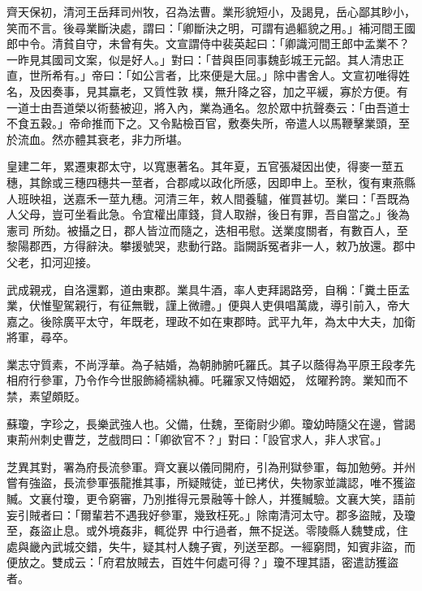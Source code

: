 \begin{pinyinscope}
 齊天保初，清河王岳拜司州牧，召為法曹。業形貌短小，及謁見，岳心鄙其眇小，笑而不言。後尋業斷決處，謂曰：「卿斷決之明，可謂有過軀貌之用。」補河間王國郎中令。清貧自守，未曾有失。文宣謂侍中裴英起曰：「卿識河間王郎中孟業不？一昨見其國司文案，似是好人。」對曰：「昔與臣同事魏彭城王元韶。其人清忠正直，世所希有。」帝曰：「如公言者，比來便是大屈。」除中書舍人。文宣初唯得姓名，及因奏事，見其羸老，又質性敦
 樸，無升降之容，加之平緩，寡於方便。有一道士由吾道榮以術藝被迎，將入內，業為通名。忽於眾中抗聲奏云：「由吾道士不食五穀。」帝命推而下之。又令點檢百官，敷奏失所，帝遣人以馬鞭擊業頭，至於流血。然亦體其衰老，非力所堪。



 皇建二年，累遷東郡太守，以寬惠著名。其年夏，五官張凝因出使，得麥一莖五穗，其餘或三穗四穗共一莖者，合郡咸以政化所感，因即申上。至秋，復有東燕縣人班映祖，送嘉禾一莖九穗。河清三年，敕人間養驢，催買甚切。業曰：「吾既為人父母，豈可坐看此急。令宜權出庫錢，貸人取辦，後日有罪，吾自當之。」後為憲司
 所劾。被攝之日，郡人皆泣而隨之，迭相弔慰。送業度關者，有數百人，至黎陽郡西，方得辭決。攀援號哭，悲動行路。詣闕訴冤者非一人，敕乃放還。郡中父老，扣河迎接。



 武成親戎，自洛還鄴，道由東郡。業具牛酒，率人吏拜謁路旁，自稱：「糞土臣孟業，伏惟聖駕親行，有征無戰，謹上微禮。」便與人吏俱唱萬歲，導引前入，帝大嘉之。後除廣平太守，年既老，理政不如在東郡時。武平九年，為太中大夫，加衛將軍，尋卒。



 業志守質素，不尚浮華。為子結婚，為朝肺腑吒羅氏。其子以蔭得為平原王段孝先相府行參軍，乃令作今世服飾綺襦紈褲。吒羅家又恃姻婭，
 炫曜矜誇。業知而不禁，素望頗貶。



 蘇瓊，字珍之，長樂武強人也。父備，仕魏，至衛尉少卿。瓊幼時隨父在邊，嘗謁東荊州刺史曹芝，芝戲問曰：「卿欲官不？」對曰：「設官求人，非人求官。」



 芝異其對，署為府長流參軍。齊文襄以儀同開府，引為刑獄參軍，每加勉勞。并州嘗有強盜，長流參軍張龍推其事，所疑賊徒，並已拷伏，失物家並識認，唯不獲盜贓。文襄付瓊，更令窮審，乃別推得元景融等十餘人，并獲贓驗。文襄大笑，語前妄引賊者曰：「爾輩若不遇我好參軍，幾致枉死。」除南清河太守。郡多盜賊，及瓊至，姦盜止息。或外境姦非，輒從界
 中行過者，無不捉送。零陵縣人魏雙成，住處與畿內武城交錯，失牛，疑其村人魏子賓，列送至郡。一經窮問，知賓非盜，而便放之。雙成云：「府君放賊去，百姓牛何處可得？」瓊不理其語，密遣訪獲盜者。




\end{pinyinscope}
